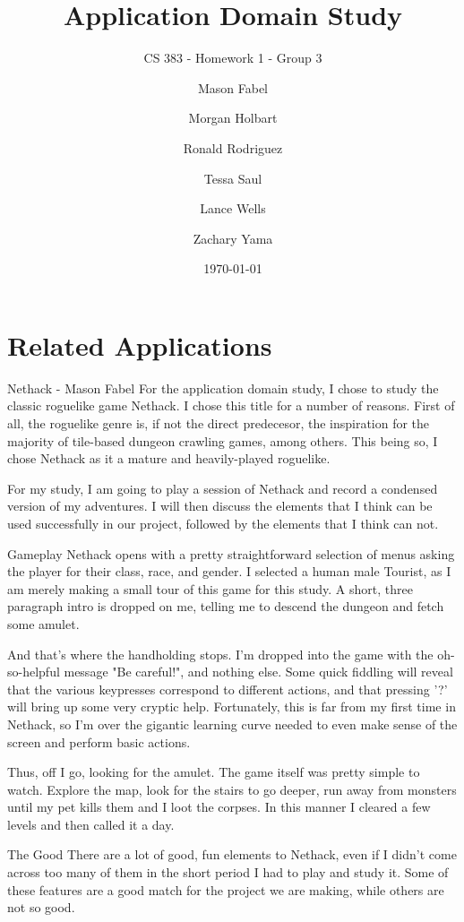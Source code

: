 \documentclass[12pt]{report}
\title{Application Domain Study}
\subtitle{CS 383 - Homework 1 - Group 3}
\author{
Mason Fabel \\
\and Morgan Holbart \\
\and Ronald Rodriguez \\
\and Tessa Saul \\
\and Lance Wells \\
\and Zachary Yama \\
}
\date{\today}
\begin{document}
\maketitle

\chapter{Related Applications}

\begin{section}{Nethack - Mason Fabel}
For the application domain study, I chose to study the classic roguelike
game Nethack. I chose this title for a number of reasons. First of all,
the roguelike genre is, if not the direct predecesor, the inspiration for
the majority of tile-based dungeon crawling games, among others. This being
so, I chose Nethack as it a mature and heavily-played roguelike.

For my study, I am going to play a session of Nethack and record a
condensed version of my adventures. I will then discuss the elements that
I think can be used successfully in our project, followed by the elements
that I think can not.

\begin{subsection}{Gameplay}
Nethack opens with a pretty straightforward selection of menus asking the
player for their class, race, and gender. I selected a human male Tourist,
as I am merely making a small tour of this game for this study. A short,
three paragraph intro is dropped on me, telling me to descend the
dungeon and fetch some amulet.

And that's where the handholding stops. I'm dropped into the game with the
oh-so-helpful message "Be careful!", and nothing else. Some quick fiddling
will reveal that the various keypresses correspond to different actions,
and that pressing '?' will bring up some very cryptic help. Fortunately,
this is far from my first time in Nethack, so I'm over the gigantic
learning curve needed to even make sense of the screen and perform basic
actions.

Thus, off I go, looking for the amulet. The game itself was pretty simple
to watch. Explore the map, look for the stairs to go deeper, run away from
monsters until my pet kills them and I loot the corpses. In this manner I
cleared a few levels and then called it a day.
\end{subsection}

\begin{subsection}{The Good}
There are a lot of good, fun elements to Nethack, even if I didn't come
across too many of them in the short period I had to play and study it.
Some of these features are a good match for the project we are making,
while others are not so good.


\end{subsection}
\end{section}
\end{document}
